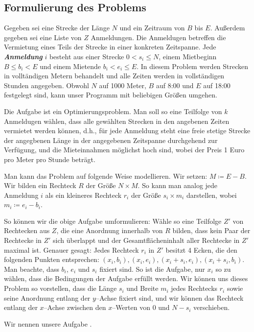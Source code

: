 \subsection{Formulierung des Problems}
Gegeben sei eine Strecke der Länge $N$ und ein Zeitraum von $B$ bis $E$.
Außerdem gegeben sei eine Liste von $Z$ Anmeldungen. 
Die Anmeldugen betreffen die Vermietung eines Teils der Strecke in einer konkreten Zeitspanne.
Jede \textbf{\textit{Anmeldung}} $i$ besteht aus einer Strecke $0 < s_i \leqslant N$,
einem Mietbeginn $B \leqslant b_i < E$ und einem Mietende $b_i < e_i \leqslant E$.
In diesem Problem werden Strecken in volltändigen Metern behandelt 
und alle Zeiten werden in vollständigen Stunden angegeben.
Obwohl $N$ auf 1000 Meter, $B$ auf 8:00 und $E$ auf 18:00 festgelegt sind,
kann unser Programm mit beliebigen Größen umgehen.

Die Aufgabe ist ein Optimierungsproblem.
Man soll so eine Teilfolge von $k$ Anmeldugen wählen,
dass alle gewählten Strecken in den angebenen Zeiten vermietet werden können, d.h.,
für jede Anmeldung steht eine freie stetige Strecke der angegbenen Länge 
in der angegebenen Zeitspanne durchgehend zur Verfügung,
und die Mieteinnahmen möglichst hoch sind, wobei der Preis 1 Euro pro Meter pro Stunde beträgt.

Man kann das Problem auf folgende Weise modellieren. 
Wir setzen: $M \coloneqq E - B$.
Wir bilden ein Rechteck $R$ der Größe $N \times M$.
So kann man analog jede Anmeldung $i$ als ein kleineres Rechteck 
$r_i$ der Größe $s_i \times m_i$ darstellen, wobei $m_i \coloneqq e_i - b_i$.

So können wir die obige Aufgabe umformulieren:
Wähle so eine Teilfolge $Z'$ von Rechtecken aus $Z$,
die eine Anordnung innerhalb von $R$ bilden,
dass kein Paar der Rechtecke in $Z'$ sich überlappt und
der Gesamtflächeninhalt aller Rechtecke in $Z'$ maximal ist.
Genauer gesagt: Jedes Rechteck $r_i$ in $Z'$ besitzt 4 Ecken,
die den folgenden Punkten entsprechen:
$(x_i, b_i), (x_i, e_i), (x_i + s_i, e_i), (x_i + s_i, b_i)$.
Man beachte, dass $b_i$, $e_i$ und $s_i$ fixiert sind. 
So ist die Aufgabe, nur $x_i$ so zu wählen, dass die Bedingungen der Aufgabe erfüllt werden.
Wir können uns dieses Problem so vorstellen, dass die Länge $s_i$ und Breite $m_i$
jedes Rechtecks $r_i$ sowie seine Anordnung entlang der $y$--Achse fixiert sind,
und wir können das Rechteck entlang der $x$--Achse zwischen den $x$--Werten von 0 und $N-s_i$ verschieben.

Wir nennen unsere Aufgabe \fp.

